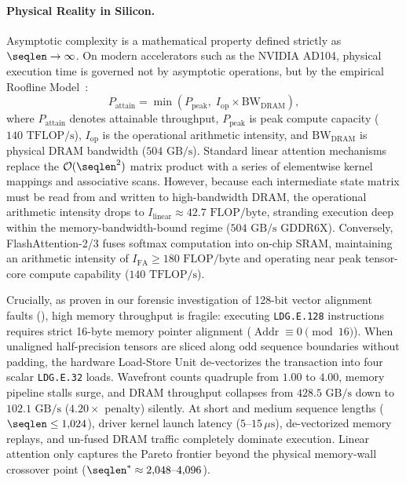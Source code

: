 \paragraph{Physical Reality in Silicon.}
Asymptotic complexity is a mathematical property defined strictly as $\seqlen \to \infty$.
On modern accelerators such as the NVIDIA AD104, physical execution time is governed not by asymptotic operations, but by the empirical Roofline Model~\cite{williams2009roofline}:
\begin{equation}
    P_{\text{attain}} = \min\left(P_{\text{peak}}, \; I_{\text{op}} \times \text{BW}_{\text{DRAM}}\right),
\end{equation}
where $P_{\text{attain}}$ denotes attainable throughput, $P_{\text{peak}}$ is peak compute capacity ($140\text{ TFLOP/s}$), $I_{\text{op}}$ is the operational arithmetic intensity, and $\text{BW}_{\text{DRAM}}$ is physical DRAM bandwidth ($504\text{ GB/s}$).
Standard linear attention mechanisms replace the $\mathcal{O}(\seqlen^2)$ matrix product with a series of elementwise kernel mappings and associative scans.
However, because each intermediate state matrix must be read from and written to high-bandwidth DRAM, the operational arithmetic intensity drops to $I_{\text{linear}} \approx 42.7\text{ FLOP/byte}$, stranding execution deep within the memory-bandwidth-bound regime ($504\text{ GB/s}$ GDDR6X).
Conversely, FlashAttention-2/3 fuses softmax computation into on-chip SRAM, maintaining an arithmetic intensity of $I_{\text{FA}} \ge 180\text{ FLOP/byte}$ and operating near peak tensor-core compute capability ($140\text{ TFLOP/s}$).

Crucially, as proven in our forensic investigation of 128-bit vector alignment faults (), high memory throughput is fragile: executing \texttt{LDG.E.128} instructions requires strict 16-byte memory pointer alignment ($\operatorname{Addr} \equiv 0 \pmod{16}$).
When unaligned half-precision tensors are sliced along odd sequence boundaries without padding, the hardware Load-Store Unit de-vectorizes the transaction into four scalar \texttt{LDG.E.32} loads.
Wavefront counts quadruple from $1.00$ to $4.00$, memory pipeline stalls surge, and DRAM throughput collapses from $428.5\text{ GB/s}$ down to $102.1\text{ GB/s}$ ($4.20\times$ penalty) silently.
At short and medium sequence lengths ($\seqlen \le 1{,}024$), driver kernel launch latency ($5\text{--}15\,\mu\text{s}$), de-vectorized memory replays, and un-fused DRAM traffic completely dominate execution.
Linear attention only captures the Pareto frontier beyond the physical memory-wall crossover point ($\seqlen^* \approx 2{,}048\text{--}4{,}096$).

